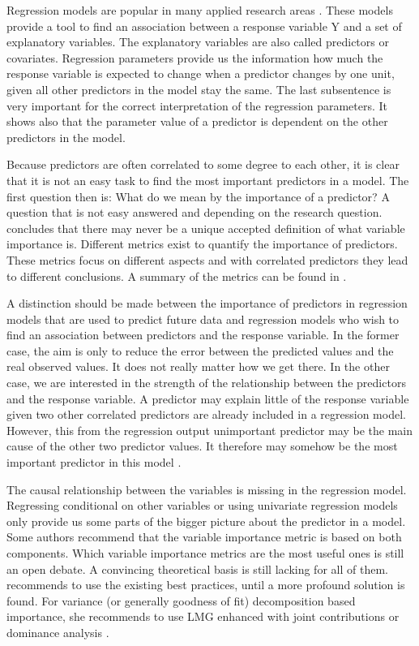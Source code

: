 \documentclass[11pt,a4paper,twoside]{book}\usepackage[]{graphicx}\usepackage[]{color}
\begin{document}
Regression models are popular in many applied research areas \citep{Nimon2013}. These models provide a tool to find an association between a response variable Y and a set of explanatory variables. The explanatory variables are also called predictors or covariates. Regression parameters provide us the information how much the response variable is expected to change when a predictor changes by one unit, given all other predictors in the model stay the same. The last subsentence is very important for the correct interpretation of the regression parameters. It shows also that the parameter value of a predictor is dependent on the other predictors in the model.

Because predictors are often correlated to some degree to each other, it is clear that it is not an easy task to find the most important predictors in a model. The first question then is: What do we  mean by the importance of a predictor? A question that is not easy answered and depending on the research question. \cite{Gromping2015} concludes that there may never  be a unique accepted definition of what variable importance is. Different metrics exist to quantify the importance of predictors. These metrics focus on different aspects and with correlated predictors they  lead to different conclusions.  A summary of the metrics can be found in  \cite{Gromping2015}.  

A distinction should be made between the importance of predictors in regression models that are used to predict future data and regression models who wish to find an association between predictors and the response variable. In the former case, the aim is only to reduce the error between the predicted values and the real observed values. It does not really matter how we get there. In the other case, we are interested in the strength of the relationship between the predictors and the response variable. A predictor may explain little of the response variable given two other correlated predictors are already included in a regression model. However, this from the regression output unimportant predictor may be the main cause of the other two predictor values.  It therefore may somehow be the most important predictor in this model \citep{Gromping2007}. 

The causal relationship between the variables is missing in the regression model. Regressing conditional on  other variables or using univariate regression models only provide us some parts of the bigger picture about the predictor in a model. Some authors recommend that the variable importance metric is based on both components.  Which variable importance metrics are the most useful ones is still an open debate. A convincing theoretical basis is still lacking for all of them.  \cite{Gromping2015} recommends to use the existing best practices, until a more profound solution is found. For variance (or generally goodness of fit) decomposition based importance, she recommends to use LMG enhanced with joint contributions or dominance analysis \citep{Gromping2007}.  
\end{document}
